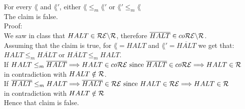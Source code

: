 For every $\lang$ and $\lang'$, either $\lang \leq_m \lang'$ or $\lang' \leq_m \lang$ \\
The claim is false. \\

Proof: \\
We saw in class that $HALT \in \mathcal{R}\mathcal{E} \backslash \mathcal{R}$, therefore $\overline{HALT} \in co\mathcal{R}\mathcal{E} \backslash \mathcal{R}$. \\
Assuming that the claim is true, for $\lang=HALT$ and $\lang'=\overline{HALT}$ we get that: \\
$HALT \leq_m \overline{HALT}$ or $\overline{HALT} \leq_m HALT$. \\

If $HALT \leq_m \overline{HALT} \\
    \Longrightarrow HALT \in co\mathcal{R}\mathcal{E} \text{ since } \overline{HALT} \in co\mathcal{R}\mathcal{E} \\
    \Longrightarrow HALT \in \mathcal{R}$ \\
in contradiction with $HALT \notin \mathcal{R}$. \\

If $\overline{HALT} \leq_m HALT \\
    \Longrightarrow \overline{HALT} \in \mathcal{R}\mathcal{E} \text{ since } HALT \in \mathcal{R}\mathcal{E} \\
    \Longrightarrow HALT \in \mathcal{R}$ \\
in contradiction with $HALT \notin \mathcal{R}$ \\

Hence that claim is false. \\

